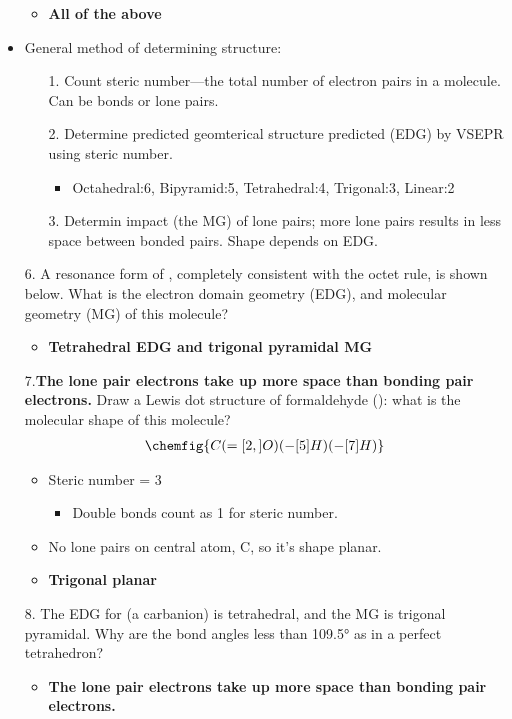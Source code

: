 \documentclass[12pt,a4paper]{article}
\begin{document}
\begin{itemize}
\begin{itemize}
\begin{itemize}
                \end{itemize}
            \item \textbf{All of the above}
        \end{itemize}
    \item General method of determining structure:
    \begin{itemize}
        \item[1.] Count steric number---the total number of electron pairs in a molecule. Can be bonds or lone pairs.
        \item[2.] Determine predicted geomterical structure predicted (EDG) by VSEPR using steric number.
            \begin{itemize}
                \item Octahedral:6, Bipyramid:5, Tetrahedral:4, Trigonal:3, Linear:2
            \end{itemize}
        \item[3.] Determin impact (the MG) of lone pairs; more lone pairs results in less space between bonded pairs. Shape depends on EDG.
    \end{itemize}
    \item[6.] A resonance form of , completely consistent with the octet rule,  is shown below.  What is the electron domain geometry (EDG), and molecular geometry (MG) of this molecule?
        \begin{itemize}
            \item \textbf{Tetrahedral EDG and trigonal pyramidal MG}
        \end{itemize}
    \item[7.\textbf{The lone pair electrons take up more space than bonding pair electrons.}] Draw a Lewis dot structure of formaldehyde (): what is the molecular shape of this molecule?
        \begin{align*}
            \chemfig{C(=[2,]O)(-[5]H)(-[7]H)}
        \end{align*}
        \begin{itemize}
            \item Steric number = 3
                \begin{itemize}
                    \item Double bonds count as 1 for steric number.
                \end{itemize}
            \item No lone pairs on central atom, C, so it's shape planar. 
            \item \textbf{Trigonal planar}
        \end{itemize}
    \item[8.] The EDG for  (a carbanion) is tetrahedral, and the MG is trigonal pyramidal.  Why are the  bond angles less than \ang{109.5} as in a perfect tetrahedron? 
        \begin{itemize}
            \item \textbf{The lone pair electrons take up more space than bonding pair electrons.}
        \end{itemize}
\end{itemize}
\end{document}
